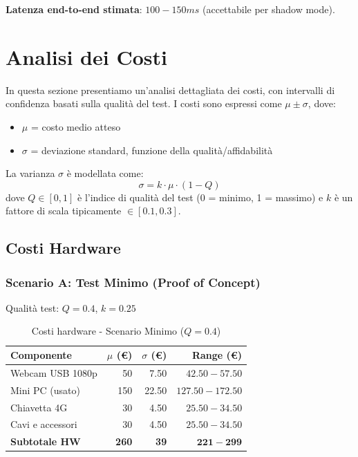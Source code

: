 \documentclass[a4paper,11pt]{article}
\begin{document}
\textbf{Latenza end-to-end stimata}: $100-150ms$ (accettabile per shadow mode).

\section{Analisi dei Costi}

In questa sezione presentiamo un'analisi dettagliata dei costi, con intervalli di confidenza basati sulla qualità del test. I costi sono espressi come $\mu \pm \sigma$, dove:

\begin{itemize}
    \item $\mu$ = costo medio atteso
    \item $\sigma$ = deviazione standard, funzione della qualità/affidabilità
\end{itemize}

La varianza $\sigma$ è modellata come:
\begin{equation}
    \sigma = k \cdot \mu \cdot (1 - Q)
\end{equation}
dove $Q \in [0, 1]$ è l'indice di qualità del test (0 = minimo, 1 = massimo) e $k$ è un fattore di scala tipicamente $\in [0.1, 0.3]$.

\subsection{Costi Hardware}

\subsubsection{Scenario A: Test Minimo (Proof of Concept)}

Qualità test: $Q = 0.4$, $k = 0.25$

\begin{table}[H]
    \centering
    \begin{tabular}{lrrr}
        \toprule
        \textbf{Componente} & \textbf{$\mu$ (€)} & \textbf{$\sigma$ (€)} & \textbf{Range (€)} \\
        \midrule
        Webcam USB 1080p & 50 & 7.50 & $42.50 - 57.50$ \\
        Mini PC (usato) & 150 & 22.50 & $127.50 - 172.50$ \\
        Chiavetta 4G & 30 & 4.50 & $25.50 - 34.50$ \\
        Cavi e accessori & 30 & 4.50 & $25.50 - 34.50$ \\
        \midrule
        \textbf{Subtotale HW} & \textbf{260} & \textbf{39} & $\mathbf{221 - 299}$ \\
        \bottomrule
    \end{tabular}
    \caption{Costi hardware - Scenario Minimo ($Q = 0.4$)}
\end{table}
\end{document}
